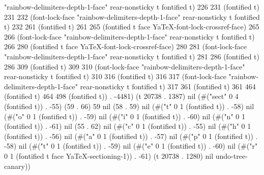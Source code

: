 "rainbow-delimiters-depth-1-face" rear-nonsticky t fontified t) 226 231 (fontified t) 231 232 (font-lock-face "rainbow-delimiters-depth-1-face" rear-nonsticky t fontified t) 232 261 (fontified t) 261 265 (fontified t face YaTeX-font-lock-crossref-face) 265 266 (font-lock-face "rainbow-delimiters-depth-1-face" rear-nonsticky t fontified t) 266 280 (fontified t face YaTeX-font-lock-crossref-face) 280 281 (font-lock-face "rainbow-delimiters-depth-1-face" rear-nonsticky t fontified t) 281 286 (fontified t) 286 309 (fontified t) 309 310 (font-lock-face "rainbow-delimiters-depth-1-face" rear-nonsticky t fontified t) 310 316 (fontified t) 316 317 (font-lock-face "rainbow-delimiters-depth-1-face" rear-nonsticky t fontified t) 317 361 (fontified t) 361 464 (fontified t) 464 498 (fontified t)) . -4481) (t 20738 . 1387) nil (#("sect" 0 4 (fontified t)) . -55) (59 . 66) 59 nil (58 . 59) nil (#("t" 0 1 (fontified t)) . -58) nil (#("o" 0 1 (fontified t)) . -59) nil (#("i" 0 1 (fontified t)) . -60) nil (#("n" 0 1 (fontified t)) . -61) nil (55 . 62) nil (#("c" 0 1 (fontified t)) . -55) nil (#("h" 0 1 (fontified t)) . -56) nil (#("a" 0 1 (fontified t)) . -57) nil (#("p" 0 1 (fontified t)) . -58) nil (#("t" 0 1 (fontified t)) . -59) nil (#("e" 0 1 (fontified t)) . -60) nil (#("r" 0 1 (fontified t face YaTeX-sectioning-1)) . -61) (t 20738 . 1280) nil undo-tree-canary))
